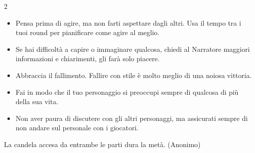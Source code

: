 \begin{multicols}{2}
\begin{itemize}[leftmargin=*]
\item
Pensa prima di agire, ma non farti aspettare dagli altri. Usa il tempo tra i tuoi round per pianificare come agire al meglio.

\item
Se hai difficoltà a capire o immaginare qualcosa, chiedi al Narratore maggiori informazioni e chiarimenti, gli farà solo piacere.

\item
Abbraccia il fallimento. Fallire con stile è molto meglio di una noiosa vittoria.

\item
Fai in modo che il tuo personaggio si preoccupi sempre di qualcosa di più della sua vita.

\item
Non aver paura di discutere con gli altri personaggi, ma assicurati sempre di non andare sul personale con i giocatori.

\end{itemize}

\end{multicols}

\vfill

\begin{enfasi}{
La candela accesa da entrambe le parti dura la metà. (Anonimo)
}\end{enfasi}







\pagebreak


